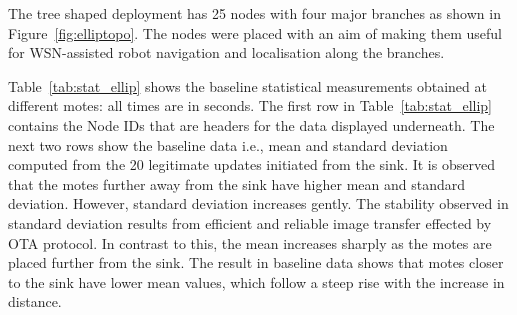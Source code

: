 \documentclass[conference,final]{IEEEtran}
\begin{document}
The tree shaped deployment has 25 nodes with four major branches as shown in Figure~\ref{fig:elliptopo}. 
The nodes were placed with an aim of making them useful for WSN-assisted robot navigation and localisation along the branches.

Table~\ref{tab:stat_ellip} shows the baseline statistical measurements obtained at different motes: all times are in seconds.
The first row in Table~\ref{tab:stat_ellip} contains the Node IDs that are headers for the data displayed underneath.
The next two rows show the baseline data i.e., mean and standard deviation computed from the 20 legitimate updates initiated from the sink.
It is observed that the motes further away from the sink have higher mean and standard deviation.  
However, standard deviation increases gently.
The stability observed in standard deviation results from efficient and reliable image transfer effected by OTA protocol.
In contrast to this, the mean increases sharply as the motes are placed further from the sink.
The result in baseline data shows that motes closer to the sink have lower mean values, which follow a steep rise with the increase in distance.
\end{document}
